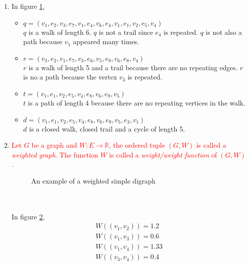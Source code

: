 \begin{enumerate}
\begin{figure}[h]
\label{walkfig}
\end{figure}
\item[] In figure \ref{walkfig},
\begin{itemize}
\item $q=(v_1,e_2,v_3,e_7,v_1,e_4,v_6,e_4,v_1,e_1,v_2,e_5,v_4)$\\ $q$ is a walk of length 6. $q$ is not a trail since $e_4$ is repeated. $q$ is not also a path because $v_1$ appeared many times.
\item $r=(v_3,e_2,v_1,e_7,v_3,e_6,v_5,e_9,v_6,e_8,v_4)$ \\ $r$ is a walk of length 5 and a trail because there are no repeating edges. $r$ is no a path because the vertex $v_3$ is repeated.
\item $t=(v_1,e_1,v_2,e_5,v_4,e_8,v_6,e_9,v_5)$ \\ $t$ is a path of length 4 because there are no repeating vertices in the walk.
\item $d=(v_1,e_1,v_2,e_5,v_4,e_8,v_6,e_9,v_5,e_3,v_1)$ \\ $d$ is a closed walk, closed trail and a cycle of length 5.
\end{itemize}
\item \textcolor{red}{Let $G$ be a graph and $W: E \rightarrow \mathbb{R}$, the ordered tuple $(G,W)$ is called a \textit{weighted graph}. The function $W$ is called a \textit{weight/weight function} of $(G,W)$.}
\begin{figure}[h!]
	\centering
{}
		\caption{An example of a weighted simple digraph}
		\label{wgraph}
	\end{figure}
\\ \\In figure \ref{wgraph},
	\begin{equation}
		\begin{array}{c}
			W((v_1,v_2))=1.2\\
			W((v_1,v_3))=0.6\\
			W((v_1,v_4))=1.33\\
			W((v_3,v_4))=0.4
		\end{array}
	\end{equation}
\end{enumerate}

